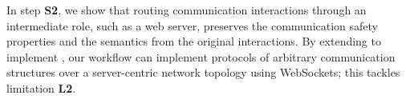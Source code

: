 In step \textbf{S2},
we show that routing communication interactions through an intermediate
role, such as a web server, preserves the communication
safety properties and the semantics from the original
interactions.
By extending \codegen to implement \newtheory,
our workflow can implement protocols of
arbitrary communication structures over a server-centric
network topology using WebSockets; 
this tackles limitation \textbf{L2}.